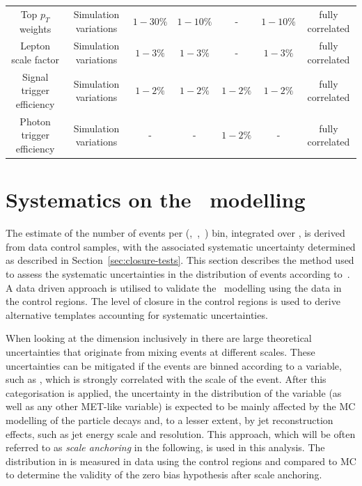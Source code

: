 \begin{landscape}
\begin{table}[h!]
\begin{tabular}{ ccccccc }
    Top $p_{T}$ weights & Simulation variations & $1-30\%$  & $1-10\%$ & - & $1-10\%$ & fully correlated \\
    Lepton scale factor & Simulation variations & $1-3\%$ & $1-3\%$ & - & $1-3\%$ & fully correlated \\
    Signal trigger efficiency & Simulation variations & $1-2\%$ & $1-2\%$ & $1-2\%$ & $1-2\%$ & fully correlated \\
    Photon trigger efficiency & Simulation variations & - & - & $1-2\%$ & - & fully correlated \\
    \hline
    \hline
  \end{tabular}
\end{table}
\end{landscape}


\section{Systematics on the \mht~modelling}
\label{sec:syst-on-shape}

The estimate of the number of events per (\njet,~\nb,~\scalht) bin,
integrated over \mht, is derived from data control samples, with
the associated systematic uncertainty determined as 
described in Section~\ref{sec:closure-tests}. This section
describes the method used to assess the systematic uncertainties in
the distribution of events according to~\mht. A data driven approach is
utilised to validate the \mht~modelling using the data in the control regions.
The level of closure in the control regions is used
to derive alternative templates accounting for systematic uncertainties.

When looking at the \mht dimension inclusively in \scalht there are
large theoretical uncertainties that originate from mixing events
at different scales. These uncertainties can be mitigated if the events 
are binned according to a variable, such as \scalht, 
which is strongly correlated with the scale of the event. 
After this categorisation is applied, the uncertainty in 
the distribution of the \mht variable
(as well as any other MET-like variable) is expected to be 
mainly affected by the MC modelling of the particle 
decays and, to a lesser extent, by jet reconstruction effects, 
such as jet energy scale and resolution. 
This approach, which will be often referred to as \textit{scale anchoring}
in the following, is used in this analysis. The distribution in \mht
is measured in data using the control regions and compared to MC
to determine the validity of the zero bias hypothesis after scale anchoring.

